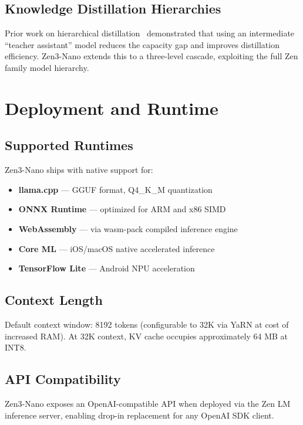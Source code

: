 \documentclass[11pt,a4paper]{article}
\begin{document}
\subsection{Knowledge Distillation Hierarchies}

Prior work on hierarchical distillation~\cite{mirzadeh2020improved} demonstrated that
using an intermediate ``teacher assistant'' model reduces the capacity gap and improves
distillation efficiency. Zen3-Nano extends this to a three-level cascade, exploiting
the full Zen family model hierarchy.

\section{Deployment and Runtime}
\label{sec:deploy}

\subsection{Supported Runtimes}

Zen3-Nano ships with native support for:
\begin{itemize}
\item \textbf{llama.cpp} --- GGUF format, Q4\_K\_M quantization
\item \textbf{ONNX Runtime} --- optimized for ARM and x86 SIMD
\item \textbf{WebAssembly} --- via wasm-pack compiled inference engine
\item \textbf{Core ML} --- iOS/macOS native accelerated inference
\item \textbf{TensorFlow Lite} --- Android NPU acceleration
\end{itemize}

\subsection{Context Length}

Default context window: 8192 tokens (configurable to 32K via YaRN at cost of
increased RAM). At 32K context, KV cache occupies approximately 64 MB at INT8.

\subsection{API Compatibility}

Zen3-Nano exposes an OpenAI-compatible API when deployed via the Zen LM inference
server, enabling drop-in replacement for any OpenAI SDK client.
\end{document}
